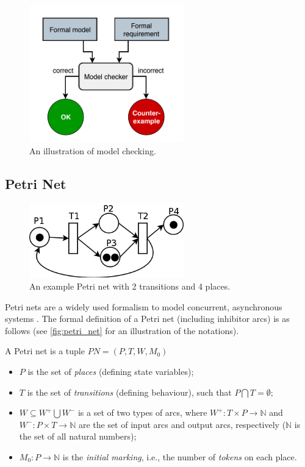 \begin{figure}[!ht]
	\centering
	\includegraphics[width=67mm, keepaspectratio]{figures/model_checking.png}\hspace{1cm}
	\caption{An illustration of model checking.}
	\label{fig:model_checking}
\end{figure}

\subsection{Petri Net}\label{ssec:petri-net}

\begin{figure}[!ht]
	\centering
	\includegraphics[width=67mm, keepaspectratio]{figures/petri_net.png}\hspace{1cm}
	\caption{An example Petri net with 2 transitions and 4 places.}
	\label{fig:petri_net}
\end{figure}

Petri nets are a widely used formalism to model concurrent, asynchronous systems \cite{24143}. The formal definition of a Petri net (including inhibitor arcs) is as follows (see \autoref{fig:petri_net} for an illustration of the notations).

\begin{definition}
	
	A Petri net is a tuple \( PN = (P, T, W, M_0) \)
	
	\begin{itemize}
		\item \(P\) is the set of \emph{places} (defining state variables);
		\item \(T\) is the set of \emph{transitions} (defining behaviour), such that \( P \bigcap T = \emptyset \);
		\item \(W \subseteq W^+ \bigcup W^- \) is a set of two types of arcs, where \(  W^+ : T \times P \rightarrow \mathbb{N}\) and \( W^- : P \times T \rightarrow \mathbb{N} \) are the set of input arcs and output arcs, respectively (\( \mathbb{N} \) is the set of all natural numbers);
		\item \(M_0 : P \rightarrow \mathbb{N} \) is the \emph{initial marking}, i.e., the number of \emph{tokens} on each place.
	\end{itemize}
\end{definition}

